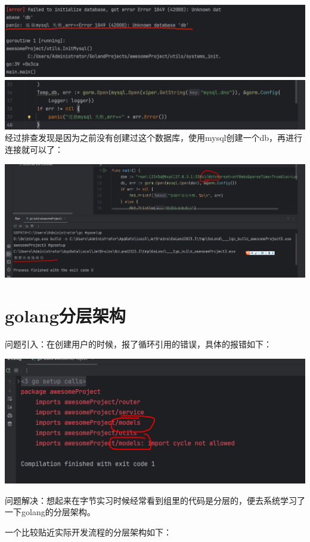 \documentclass[12pt]{article}
\begin{document}
	\includegraphics[scale=0.5]{3.png}
	\includegraphics[scale=0.5]{4.png}
	经过排查发现是因为之前没有创建过这个数据库，使用mysql创建一个db，再进行连接就可以了：
	
	\includegraphics[scale=0.5]{5.png}
	
	\section{golang分层架构}
	问题引入：在创建用户的时候，报了循环引用的错误，具体的报错如下：
	
	\includegraphics{6.png}
	
	问题解决：想起来在字节实习时候经常看到组里的代码是分层的，便去系统学习了一下golang的分层架构。
	
	一个比较贴近实际开发流程的分层架构如下：
	
\end{document}

